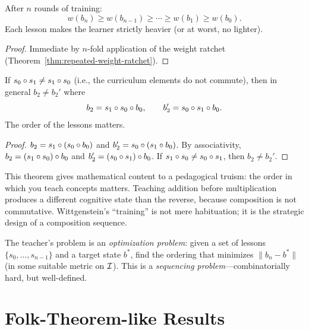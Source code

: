 \begin{theorem}
\label{thm:training-enrichment}
After $n$ rounds of training:
\[
  w(b_n) \geq w(b_{n-1}) \geq \cdots \geq w(b_1) \geq w(b_0).
\]
Each lesson makes the learner strictly heavier (or at worst, no lighter).
\end{theorem}

\begin{proof}
Immediate by $n$-fold application of the weight ratchet
(Theorem~\ref{thm:repeated-weight-ratchet}).
\end{proof}

\begin{theorem}
\label{thm:training-order}
If $s_0 \circ s_1 \neq s_1 \circ s_0$ (i.e., the curriculum elements
do not commute), then in general $b_2 \neq b_2'$ where
\[
  b_2 = s_1 \circ s_0 \circ b_0, \qquad
  b_2' = s_0 \circ s_1 \circ b_0.
\]
The order of the lessons matters.
\end{theorem}

\begin{proof}
$b_2 = s_1 \circ (s_0 \circ b_0)$ and
$b_2' = s_0 \circ (s_1 \circ b_0)$.  By associativity,
$b_2 = (s_1 \circ s_0) \circ b_0$ and
$b_2' = (s_0 \circ s_1) \circ b_0$.  If $s_1 \circ s_0 \neq
s_0 \circ s_1$, then $b_2 \neq b_2'$.
\end{proof}

\begin{interpretation}
\label{interp:curriculum}
This theorem gives mathematical content to a pedagogical truism: the order in
which you teach concepts matters.  Teaching addition before multiplication
produces a different cognitive state than the reverse, because composition is
not commutative.  Wittgenstein's ``training'' is not mere habituation; it is
the strategic design of a composition sequence.

The teacher's problem is an \emph{optimization problem}: given a set of
lessons $\{s_0, \ldots, s_{n-1}\}$ and a target state $b^*$, find the
ordering that minimizes $\|b_n - b^*\|$ (in some suitable metric on $\mathcal{I}$).
This is a \emph{sequencing problem}---combinatorially hard, but well-defined.
\end{interpretation}


\section{Folk-Theorem-like Results}

